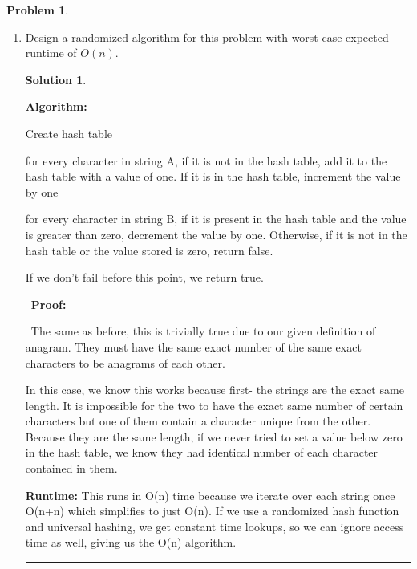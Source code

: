 \documentclass{article}
\theoremstyle{definition}
\newtheorem{problem}{Problem}
\def\fline{\rule{0.75\linewidth}{0.5pt}}
\newcommand{\finishline}{
  \begin{center}\fline
\end{center}}
\newtheorem*{solution*}{Solution}
\newenvironment{solution}{
\begin{solution*}}{{\finishline}
\end{solution*}}
\begin{document}
\begin{problem}
\begin{enumerate}
  \item[(b)] Design a randomized algorithm for this problem with worst-case expected runtime of $O(n)$.

    \begin{solution}
      \

      \textbf{Algorithm:}
      \

      Create hash table

      for every character in string A, if it is not in the hash table, add it to the hash table with a value of one.
      If it is in the hash table, increment the value by one

      for every character in string B, if it is present in the hash table and the value is greater than zero, decrement the value by one.
      Otherwise, if it is not in the hash table or the value stored is zero, return false.

      If we don't fail before this point, we return true.

      \
      \textbf{Proof:}

      \
      The same as before, this is trivially true due to our given definition of anagram. They must have the same exact number of the same exact characters to be anagrams of each other.

      In this case, we know this works because first- the strings are the exact same length. It is impossible for the two to have the exact same number of certain characters but one of them contain a character unique from the other.
      Because they are the same length, if we never tried to set a value below zero in the hash table, we know they had identical number of each character contained in them.
      \

      \textbf{Runtime:}
      This runs in O(n) time because we iterate over each string once O(n+n) which simplifies to just O(n). If we use a randomized hash function and universal hashing, we get constant time lookups, so we can ignore access time as well, giving us the O(n) algorithm.
    \end{solution}

\end{enumerate}

\end{problem}

\newpage
\end{document}

